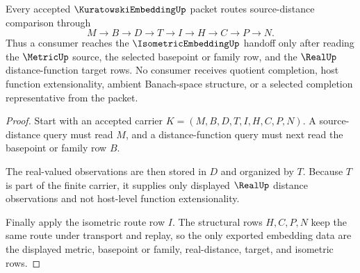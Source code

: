 \begin{theorem}
\label{thm:kuratowski-embedding-distance-route}
Every accepted $\KuratowskiEmbeddingUp$ packet routes source-distance comparison through
$$
M \to B \to D \to T \to I \to H \to C \to P \to N.
$$
Thus a consumer reaches the $\IsometricEmbeddingUp$ handoff only after reading the $\MetricUp$ source, the selected basepoint or family row, and the $\RealUp$ distance-function target rows. No consumer receives quotient completion, host function extensionality, ambient Banach-space structure, or a selected completion representative from the packet.
\end{theorem}
\begin{proof}
Start with an accepted carrier $K=(M,B,D,T,I,H,C,P,N)$. A source-distance query must read $M$, and a distance-function query must next read the basepoint or family row $B$.

The real-valued observations are then stored in $D$ and organized by $T$. Because $T$ is part of the finite carrier, it supplies only displayed $\RealUp$ distance observations and not host-level function extensionality.

Finally apply the isometric route row $I$. The structural rows $H,C,P,N$ keep the same route under transport and replay, so the only exported embedding data are the displayed metric, basepoint or family, real-distance, target, and isometric rows.
\end{proof}

